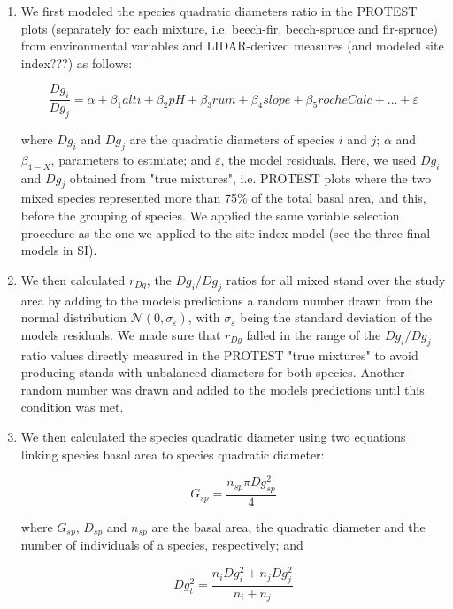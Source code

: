 \documentclass[a4paper]{article}
\begin{document}
\begin{enumerate}

  \item We first modeled the species quadratic diameters ratio in the PROTEST plots (separately for each mixture, i.e. beech-fir, beech-spruce and fir-spruce) from environmental variables and LIDAR-derived measures (and modeled site index???) as follows:

  \begin{equation}\label{DgModel}
    \frac{Dg_i}{Dg_j} = \alpha + \beta_1 alti + \beta_2 pH +\beta_3 rum +\beta_4 slope +\beta_5 rocheCalc+...+\varepsilon
  \end{equation}

  where $Dg_i$ and $Dg_j$ are the quadratic diameters of species $i$ and $j$; $\alpha$ and $\beta_{1-X}$, parameters to estmiate; and $\varepsilon$, the model residuals. Here, we used $Dg_i$ and $Dg_j$ obtained from "true mixtures", i.e. PROTEST plots where the two mixed species represented more than 75\% of the total basal area, and this, before the grouping of species. We applied the same variable selection procedure as the one we applied to the site index model (see the three final models in SI).

  \item We then calculated $r_{Dg}$, the $Dg_i / Dg_j$ ratios for all mixed stand over the study area by adding to the models predictions a random number drawn from the normal distribution $\mathcal{N} (0, \sigma_\varepsilon)$, with $\sigma_\varepsilon$ being the standard deviation of the models residuals. We made sure that $r_{Dg}$ falled in the range of the $Dg_i / Dg_j$ ratio values directly measured in the PROTEST "true mixtures" to avoid producing stands with unbalanced diameters for both species. Another random number was drawn and added to the models predictions until this condition was met.

  \item We then calculated the species quadratic diameter using two equations linking species basal area to species quadratic diameter:

  \begin{equation}\label{Gsp}
    G_{sp} = \frac{n_{sp}\pi Dg_{sp}^2}{4}
  \end{equation}

  where $G_{sp}$, $D_{sp}$ and $n_{sp}$ are the basal area, the quadratic diameter and the number of individuals of a species, respectively; and

  \begin{equation}\label{}
    Dg_t^2 = \frac{n_iDg_i^2 + n_jDg_j^2}{n_i + n_j}
  \end{equation}


\end{enumerate}
\end{document}
